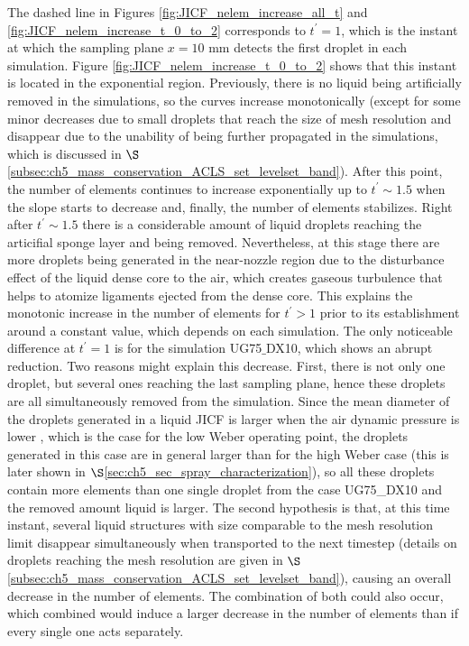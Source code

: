 The dashed line in Figures \ref{fig:JICF_nelem_increase_all_t} and  \ref{fig:JICF_nelem_increase_t_0_to_2} corresponds  to $t^{\prime} = 1$, which is the instant at which the sampling plane $x = 10$ mm detects the first droplet in each simulation. Figure \ref{fig:JICF_nelem_increase_t_0_to_2} shows that this instant is located in the exponential region. Previously, there is no liquid being artificially removed in the simulations, so the curves increase monotonically (except for some minor decreases due to small droplets that reach the size of mesh resolution and disappear due to the unability of being further propagated in the simulations, which is discussed in $\S$\ref{subsec:ch5_mass_conservation_ACLS_set_levelset_band}). After this point, the number of elements continues to increase exponentially up to $t^{\prime} \sim 1.5$ when the slope starts to decrease and, finally, the number of elements  stabilizes. Right after $t^{\prime} \sim 1.5$ there is a considerable amount of liquid droplets reaching the articifial sponge layer and being removed. Nevertheless, at this stage there are more droplets being generated in the near-nozzle region due to the disturbance effect of the liquid dense core to the air, which creates gaseous turbulence that helps to atomize ligaments ejected from the dense core. This explains the monotonic increase in the number of elements for $t^{\prime} > 1$ prior to its establishment around a constant value, which depends on each simulation. The only noticeable difference at $t^{\prime} = 1$ is for the simulation UG75$\_$DX10, which shows an abrupt reduction. Two reasons might explain this decrease. First, there is not only one droplet, but several ones reaching the last sampling plane, hence these droplets are all simultaneously removed from the simulation. Since the mean diameter of the droplets generated in a liquid JICF is larger when the air dynamic pressure is lower , which is the case for the low Weber operating point, the droplets generated in this case are in general larger than for the high Weber case (this is later shown in $\S$\ref{sec:ch5_sec_spray_characterization}), so all these droplets contain more elements than one single droplet from the case UG75\_DX10 and the removed amount liquid is larger. The second hypothesis is that, at this time instant, several liquid structures with size comparable to the mesh resolution limit disappear simultaneously when transported to the next timestep (details on droplets reaching the mesh resolution are given in $\S$\ref{subsec:ch5_mass_conservation_ACLS_set_levelset_band}), causing an overall decrease in the number of elements. The combination of both could also occur, which combined would induce a larger decrease in the number of elements than if every single one acts separately.

